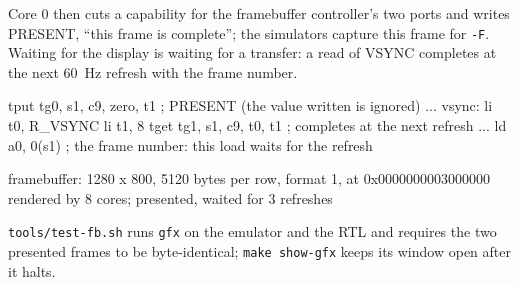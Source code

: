 Core 0 then cuts a capability for the framebuffer controller's two ports and writes PRESENT, ``this
frame is complete''; the simulators capture this frame for \texttt{-F}. Waiting for the display is
waiting for a transfer: a read of VSYNC completes at the next 60~Hz refresh with the frame number.

\begin{asm}
        tput  tg0, s1, c9, zero, t1     ; PRESENT (the value written is ignored)
        ...
vsync:
        li    t0, R_VSYNC
        li    t1, 8
        tget  tg1, s1, c9, t0, t1       ; completes at the next refresh
        ...
        ld    a0, 0(s1)                 ; the frame number: this load waits for the refresh
\end{asm}

\begin{shell}
framebuffer: 1280 x 800, 5120 bytes per row, format 1, at 0x0000000003000000
rendered by 8 cores; presented, waited for 3 refreshes
\end{shell}

\texttt{tools/test-fb.sh} runs \texttt{gfx} on the emulator and the RTL and requires the two presented
frames to be byte-identical; \texttt{make show-gfx} keeps its window open after it halts.
